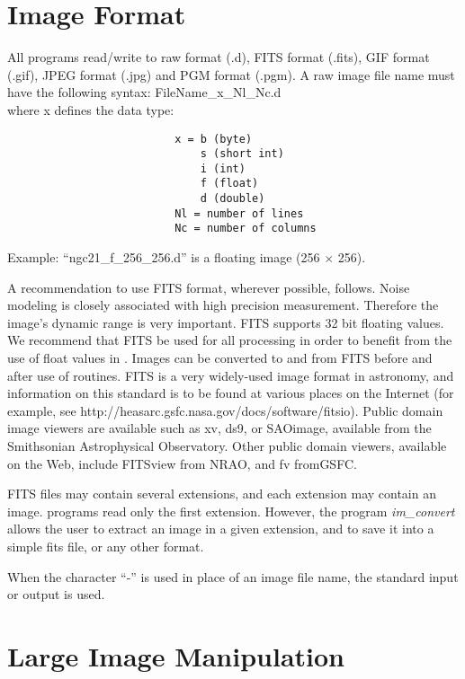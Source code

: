 \section{Image Format}
All programs read/write to raw format (.d), FITS format (.fits), 
GIF format (.gif), JPEG format (.jpg) and PGM format (.pgm). 
A raw image file name must have the 
following syntax:  FileName\_x\_Nl\_Nc.d \\
 where x defines the data type: 
\begin{verbatim}
                          x = b (byte)
                              s (short int)
                              i (int)
                              f (float)
                              d (double)
                          Nl = number of lines
                          Nc = number of columns
\end{verbatim}
 Example: ``ngc21\_f\_256\_256.d'' is a floating image (256 $\times$ 256).


A recommendation to use FITS format, wherever possible, follows.
  Noise modeling is closely
associated with high precision measurement.  Therefore the image's dynamic
range is very important. FITS supports 32 bit floating values.  
 We recommend that FITS be used for all processing in order to benefit from
the use of float values in \proj.  Images can be converted to and 
from FITS before and after use of \proj routines.  FITS is a very widely-used
image format in astronomy, and information on this standard is to be found
at various places on the Internet 
(for example, see http://heasarc.gsfc.nasa.gov/docs/software/fitsio).  
Public domain image viewers are available  
such as xv, ds9, or SAOimage, available from the 
Smithsonian Astrophysical Observatory.  Other public domain viewers, 
available on the Web, 
include FITSview from NRAO, and fv fromGSFC.  

FITS files may contain several extensions, and each extension may contain 
an image. \proj programs read only the first extension. However, the 
program {\em im\_convert} allows the user to extract an image
in a given extension, and to save it into a simple fits file, or any other
format.

When the character ``-'' is used in place of an
image file name, the standard input or
output is used. 

\section{Large Image Manipulation}

